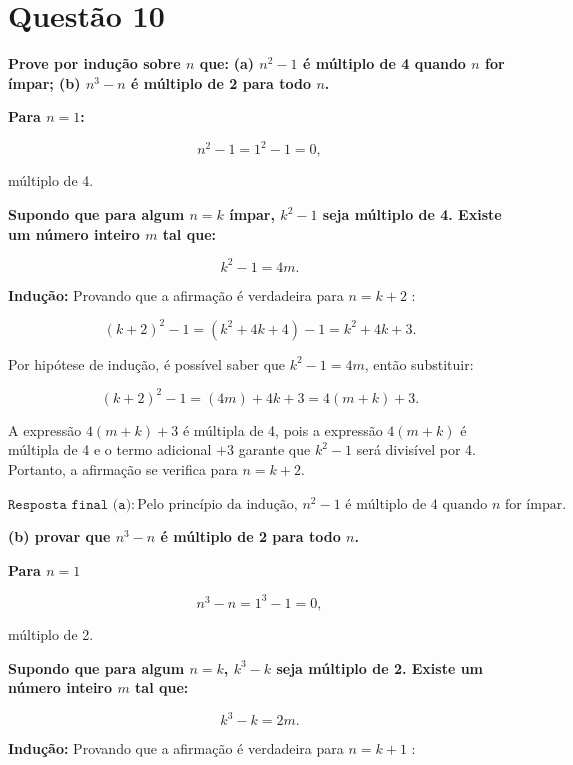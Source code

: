 \vspace{10pt}

\section*{Questão 10}

\textbf{Prove por indução sobre \(n\) que:} 
\textbf{(a) \(n^2 - 1\) é múltiplo de 4 quando \(n\) for ímpar; (b) \(n^3 - n\) é múltiplo de 2 para todo \(n\).}

\textbf{Para \(n = 1\):}

\[
n^2 - 1 = 1^2 - 1 = 0,
\]

múltiplo de 4.

\textbf{Supondo que para algum \(n = k\) ímpar, \(k^2 - 1\) seja múltiplo de 4. Existe um número inteiro \(m\) tal que:} 

\[
k^2 - 1 = 4m.
\]

\textbf{Indução:} Provando que a afirmação é verdadeira para \(n = k + 2\) :

\[
(k+2)^2 - 1 = (k^2 + 4k + 4) - 1 = k^2 + 4k + 3.
\]

Por hipótese de indução, é possível saber que \(k^2 - 1 = 4m\), então substituir:

\[
(k+2)^2 - 1 = (4m) + 4k + 3 = 4(m + k) + 3.
\]

A expressão \(4(m + k) + 3\) é  múltipla de 4, pois a expressão \(4(m+k)\) é múltipla de 4 e o termo adicional \(+3\) garante que \(k^2 - 1\) será divisível por 4. Portanto, a afirmação se verifica para \(n = k+2\).

\vspace{10pt}

\(\boxed{\texttt{Resposta final (a):} \, \text{Pelo princípio da indução, } n^2 - 1 \text{ é múltiplo de 4 quando } n \text{ for ímpar.}}\)

\vspace{1cm}

\textbf{(b) provar que \(n^3 - n\) é múltiplo de 2 para todo \(n\).}

\textbf{Para \(n = 1\)}

\[
n^3 - n = 1^3 - 1 = 0,
\]

múltiplo de 2.

\textbf{Supondo que para algum \(n = k\), \(k^3 - k\) seja múltiplo de 2. Existe um número inteiro \(m\) tal que:}

\[
k^3 - k = 2m.
\]

\textbf{Indução:} Provando que a afirmação é verdadeira para \(n = k + 1\) :


